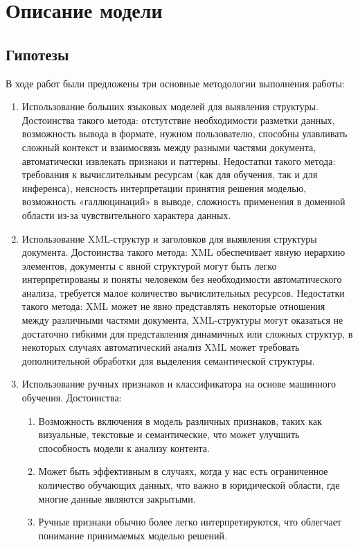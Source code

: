 \section{Описание модели}
\subsection{Гипотезы}
В ходе работ были предложены три основные методологии выполнения работы:
\begin{enumerate}
\item Использование больших языковых моделей для выявления структуры. Достоинства такого метода: отстутствие необходимости разметки данных, возможность вывода в формате, нужном пользователю, способны улавливать сложный контекст и взаимосвязь между разными частями документа, автоматически извлекать признаки и паттерны. Недостатки такого метода: требования к вычислительным ресурсам (как для обучения, так и для инференса), неясность интерпретации принятия решения моделью, возможность «галлюцинаций» в выводе, сложность применения в доменной области из-за чувствительного характера данных.
\item Использование XML-структур и заголовков для выявления структуры документа. Достоинства такого метода: XML обеспечивает явную иерархию элементов, документы с явной структурой могут быть легко интерпретированы и поняты человеком без необходимости автоматического анализа, требуется малое количество вычислительных ресурсов. Недостатки такого метода: XML может не явно представлять некоторые отношения между различными частями документа, XML-структуры могут оказаться не достаточно гибкими для представления динамичных или сложных структур, в некоторых случаях автоматический анализ XML может требовать дополнительной обработки для выделения семантической структуры.
\item Использование ручных признаков и классификатора на основе машинного обучения. Достоинства:
  \begin{enumerate}
  \item Возможность включения в модель различных признаков, таких как визуальные, текстовые и семантические, что может улучшить способность модели к анализу контента.
  \item Может быть эффективным в случаях, когда у нас есть ограниченное количество обучающих данных, что важно в юридической области, где многие данные являются закрытыми.
  \item Ручные признаки обычно более легко интерпретируются, что облегчает понимание принимаемых моделью решений.

\end{enumerate}
\end{enumerate}
